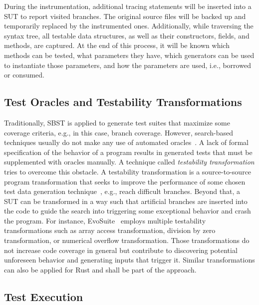 \documentclass{article}
\begin{document}
During the instrumentation, additional tracing statements will be inserted into a \ac{SUT} to report visited branches. The original source files will be backed up and temporarily replaced by the instrumented ones. Additionally, while traversing the syntax tree, all testable data structures, as well as their constructors, fields, and methods, are captured. At the end of this process, it will be known which methods can be tested, what parameters they have, which generators can be used to instantiate those parameters, and how the parameters are used, i.e., borrowed or consumed. 

\subsection{Test Oracles and Testability Transformations}
Traditionally, \ac{SBST} is applied to generate test suites that maximize some coverage criteria, e.g., in this case, branch coverage. However, search-based techniques usually do not make any use of automated oracles~\cite{Fraser2013}. A lack of formal specification of the behavior of a program results in generated tests that must be supplemented with oracles manually. A technique called \textit{testability transformation} tries to overcome this obstacle. A testability transformation is a source-to-source program transformation that seeks to improve the performance of some chosen test data generation technique~\cite{Harman2004}, e.g., reach difficult branches. Beyond that, a \ac{SUT} can be transformed in a way such that artificial branches are inserted into the code to guide the search into triggering some exceptional behavior and crash the program. For instance, EvoSuite~\cite{Fraser2013} employs multiple testability transformations such as array access transformation, division by zero transformation, or numerical overflow transformation. Those transformations do not increase code coverage in general but contribute to discovering potential unforeseen behavior and generating inputs that trigger it. Similar transformations can also be applied for Rust and shall be part of the approach.

\subsection{Test Execution}
\end{document}
